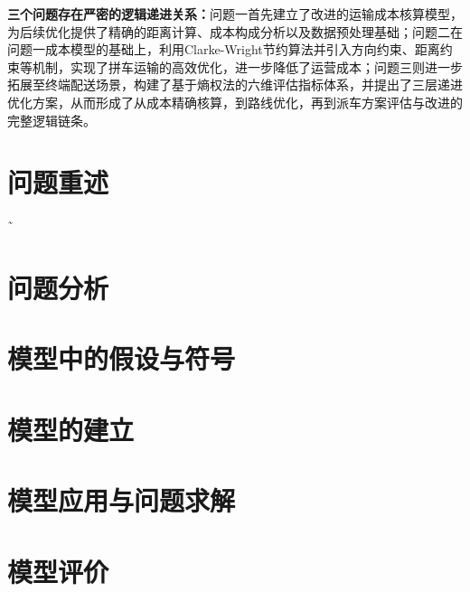 \documentclass[12pt,fontset=fandol]{ctexart}
\begin{document}
{\bf 三个问题存在严密的逻辑递进关系：}问题一首先建立了改进的运输成本核算模型，为后续优化提供了精确的距离计算、成本构成分析以及数据预处理基础；问题二在问题一成本模型的基础上，利用Clarke-Wright节约算法并引入方向约束、距离约束等机制，实现了拼车运输的高效优化，进一步降低了运营成本；问题三则进一步拓展至终端配送场景，构建了基于熵权法的六维评估指标体系，并提出了三层递进优化方案，从而形成了从成本精确核算，到路线优化，再到派车方案评估与改进的完整逻辑链条。

\vspace{1em}

\newpage
\setcounter{page}{1}

\section{问题重述}\label{sec:problem-statement}

˜

\section{问题分析}\label{sec:problem-analysis}


\section{模型中的假设与符号}\label{sec:assumptions-and-symbols}


\section{模型的建立}\label{sec:model-construction}


\section{模型应用与问题求解}\label{sec:problem-solving}


\section{模型评价}\label{sec:model-evaluation}



\newpage
\end{document}
